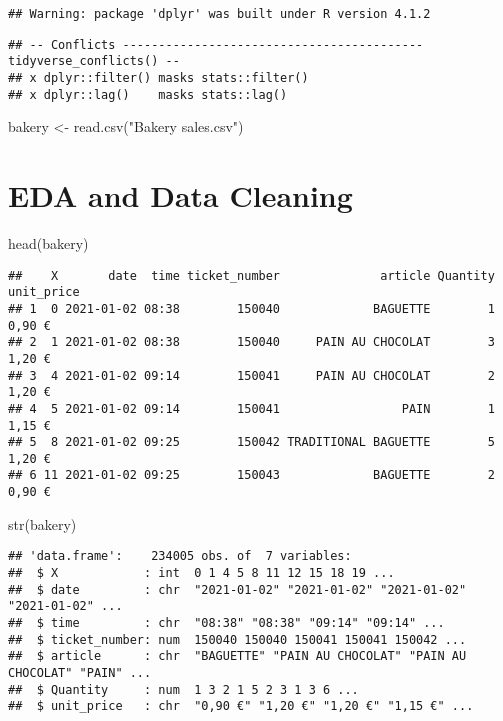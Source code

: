 \documentclass[
]{article}
\newenvironment{Shaded}{\begin{snugshade}}{\end{snugshade}}
\newcommand{\FunctionTok}[1]{\textcolor[rgb]{0.00,0.00,0.00}{#1}}
\newcommand{\NormalTok}[1]{#1}
\newcommand{\OtherTok}[1]{\textcolor[rgb]{0.56,0.35,0.01}{#1}}
\newcommand{\StringTok}[1]{\textcolor[rgb]{0.31,0.60,0.02}{#1}}
\begin{document}
\begin{verbatim}
## Warning: package 'dplyr' was built under R version 4.1.2
\end{verbatim}

\begin{verbatim}
## -- Conflicts ------------------------------------------ tidyverse_conflicts() --
## x dplyr::filter() masks stats::filter()
## x dplyr::lag()    masks stats::lag()
\end{verbatim}

\begin{Shaded}
\begin{Highlighting}[]
\NormalTok{bakery }\OtherTok{\textless{}{-}} \FunctionTok{read.csv}\NormalTok{(}\StringTok{"Bakery sales.csv"}\NormalTok{)}
\end{Highlighting}
\end{Shaded}

\hypertarget{eda-and-data-cleaning}{%
\section{EDA and Data Cleaning}\label{eda-and-data-cleaning}}

\begin{Shaded}
\begin{Highlighting}[]
\FunctionTok{head}\NormalTok{(bakery)}
\end{Highlighting}
\end{Shaded}

\begin{verbatim}
##    X       date  time ticket_number              article Quantity unit_price
## 1  0 2021-01-02 08:38        150040             BAGUETTE        1     0,90 €
## 2  1 2021-01-02 08:38        150040     PAIN AU CHOCOLAT        3     1,20 €
## 3  4 2021-01-02 09:14        150041     PAIN AU CHOCOLAT        2     1,20 €
## 4  5 2021-01-02 09:14        150041                 PAIN        1     1,15 €
## 5  8 2021-01-02 09:25        150042 TRADITIONAL BAGUETTE        5     1,20 €
## 6 11 2021-01-02 09:25        150043             BAGUETTE        2     0,90 €
\end{verbatim}

\begin{Shaded}
\begin{Highlighting}[]
\FunctionTok{str}\NormalTok{(bakery)}
\end{Highlighting}
\end{Shaded}

\begin{verbatim}
## 'data.frame':    234005 obs. of  7 variables:
##  $ X            : int  0 1 4 5 8 11 12 15 18 19 ...
##  $ date         : chr  "2021-01-02" "2021-01-02" "2021-01-02" "2021-01-02" ...
##  $ time         : chr  "08:38" "08:38" "09:14" "09:14" ...
##  $ ticket_number: num  150040 150040 150041 150041 150042 ...
##  $ article      : chr  "BAGUETTE" "PAIN AU CHOCOLAT" "PAIN AU CHOCOLAT" "PAIN" ...
##  $ Quantity     : num  1 3 2 1 5 2 3 1 3 6 ...
##  $ unit_price   : chr  "0,90 €" "1,20 €" "1,20 €" "1,15 €" ...
\end{verbatim}
\end{document}
